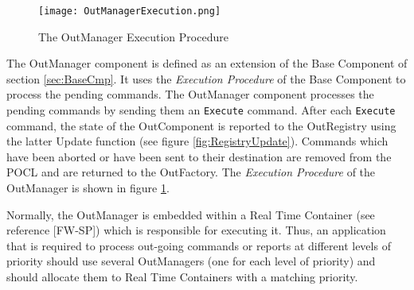 \begin{figure}[h]
 \centering
 \texttt{[image: OutManagerExecution.png]}
 \caption{The OutManager Execution Procedure}
 \label{fig:OutManagerExecution}
\end{figure}

The OutManager component is defined as an extension of the Base Component of section \ref{sec:BaseCmp}. It uses the \textit{Execution Procedure} of the Base Component to process the pending commands. The OutManager component processes the pending commands by sending them an \texttt{Execute} command. After each \texttt{Execute} command, the state of the OutComponent is reported to the OutRegistry using the latter Update function (see figure \ref{fig:RegistryUpdate}). Commands which have been aborted or have been sent to their destination are removed from the POCL and are returned to the OutFactory. The \textit{Execution Procedure} of the OutManager is shown in figure \ref{fig:OutManagerExecution}.

Normally, the OutManager is embedded within a Real Time Container (see reference [FW-SP]) which is responsible for executing it. Thus, an application that is required to process out-going commands or reports at different levels of priority should use several OutManagers (one for each level of priority) and should allocate them to Real Time Containers with a matching priority.

